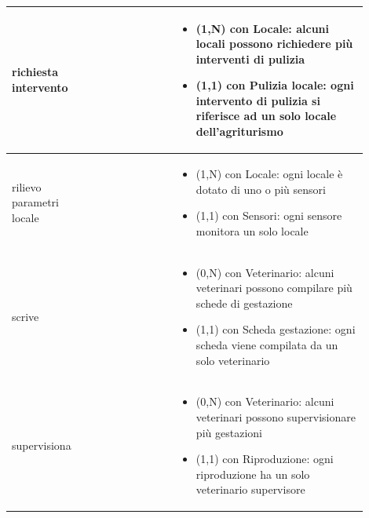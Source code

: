 \documentclass[12pt,a4paper]{article}
\begin{document}
\begin{center}
\begin{longtable}{|p{0.16\linewidth}|p{0.24\linewidth}|p{0.50\linewidth}|}
\hline
richiesta intervento 				& \begin{flushleft}\vspace{-15pt}  \end{flushleft}
					& \begin{itemize}
						\setlength{\itemindent}{-1em}
						\vspace{-25pt}
						\setlength\itemsep{-0.25em}
						\item (1,N) con Locale: alcuni locali possono richiedere più interventi di pulizia
						\item (1,1) con Pulizia locale: ogni intervento di pulizia si riferisce ad un solo locale dell'agriturismo
					\end{itemize}\\ 

\hline
rilievo parametri locale 				& \begin{flushleft}\vspace{-15pt}  \end{flushleft}
					& \begin{itemize}
						\setlength{\itemindent}{-1em}
						\vspace{-25pt}
						\setlength\itemsep{-0.25em}
						\item (1,N) con Locale: ogni locale è dotato di uno o più sensori
						\item (1,1) con Sensori: ogni sensore monitora un solo locale
					\end{itemize}\\ 

\hline
scrive				& \begin{flushleft}\vspace{-15pt}  \end{flushleft}
					& \begin{itemize}
						\setlength{\itemindent}{-1em}
						\vspace{-25pt}
						\setlength\itemsep{-0.25em}
						\item (0,N) con Veterinario: alcuni veterinari possono compilare più schede di gestazione
						\item (1,1) con Scheda gestazione: ogni scheda viene compilata da un solo veterinario
					\end{itemize}\\ 

\hline
supervisiona				& \begin{flushleft}\vspace{-15pt}  \end{flushleft}
					& \begin{itemize}
						\setlength{\itemindent}{-1em}
						\vspace{-25pt}
						\setlength\itemsep{-0.25em}
						\item (0,N) con Veterinario: alcuni veterinari possono supervisionare più gestazioni
						\item (1,1) con Riproduzione: ogni riproduzione ha un solo veterinario supervisore
					\end{itemize}\\ 


\end{longtable}
\end{center}
\end{document}
